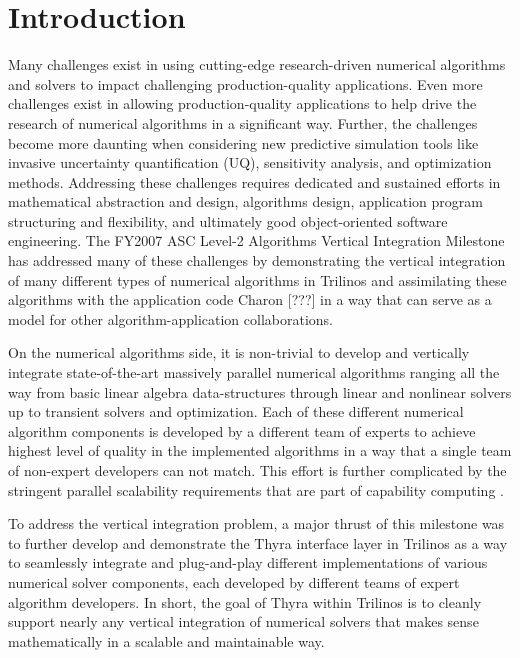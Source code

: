 \documentclass[pdf,ps2pdf,11pt]{SANDreport}
\begin{document}
%

\SANDmain %

%
\section{Introduction}
%

Many challenges exist in using cutting-edge research-driven numerical
algorithms and solvers to impact challenging production-quality applications.
Even more challenges exist in allowing production-quality applications to help
drive the research of numerical algorithms in a significant way.  Further, the
challenges become more daunting when considering new predictive simulation
tools like invasive uncertainty quantification (UQ), sensitivity analysis, and
optimization methods.  Addressing these challenges requires dedicated and
sustained efforts in mathematical abstraction and design, algorithms design,
application program structuring and flexibility, and ultimately good
object-oriented software engineering.  The FY2007 ASC Level-2 Algorithms
Vertical Integration Milestone has addressed many of these challenges by
demonstrating the vertical integration of many different types of numerical
algorithms in Trilinos {}\cite{ref:trilinos} and assimilating these algorithms with the
application code Charon [???] in a way that can serve as a model for other
algorithm-application collaborations.

On the numerical algorithms side, it is non-trivial to develop and vertically
integrate state-of-the-art massively parallel numerical algorithms ranging all
the way from basic linear algebra data-structures through linear and nonlinear
solvers up to transient solvers and optimization.  Each of these different
numerical algorithm components is developed by a different team of experts to
achieve highest level of quality in the implemented algorithms in a way that a
single team of non-expert developers can not match.  This effort is further
complicated by the stringent parallel scalability requirements that are part
of capability computing {}\cite{book:SC}.

To address the vertical integration problem, a major thrust of this milestone
was to further develop and demonstrate the Thyra interface layer in Trilinos
as a way to seamlessly integrate and plug-and-play different implementations of
various numerical solver components, each developed by different teams of
expert algorithm developers.  In short, the goal of Thyra within Trilinos is
to cleanly support nearly any vertical integration of numerical solvers that
makes sense mathematically in a scalable and maintainable way.
\end{document}
